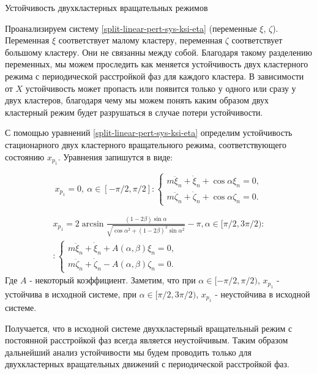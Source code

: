 \begin{chapter}{Устойчивость двухкластерных вращательных режимов}
	
	Проанализируем систему \ref{split-linear-pert-sys-ksi-eta} (переменные $\xi$, $\zeta$).
	Переменная $\xi$ соответствует малому кластеру, переменная $\zeta$ соответствует большому кластеру. 
	Они не связанны между собой.
	Благодаря такому разделению переменных, мы можем проследить как меняется устойчивость
	двух кластерного режима с периодической расстройкой фаз для каждого кластера. В зависимости от $X$ устойчивость
	может пропасть или появится только у одного или сразу у двух кластеров, благодаря чему мы можем
	понять каким образом двух кластерный режим будет разрушаться в случае потери устойчивости.

	С помощью уравнений \ref{split-linear-pert-sys-ksi-eta} определим устойчивость стационарного
	двух кластерного вращательного режима, соответствующего состоянию $x_{p_1}$.
	Уравнения запишутся в виде:

	\begin{equation}
		x_{p_1} = 0, \ \alpha \in [-\pi/ 2, \pi/2]: 
		\begin{cases}
			m\ddot{\xi}_n + \dot{\xi}_n + \cos{\alpha}\xi_n = 0, \\
			m\ddot{\zeta}_n + \dot{\zeta}_n + \cos{\alpha}\zeta_n = 0.
		\end{cases}
	\end{equation}

	\begin{equation}
		\begin{split}
			x_{p_1} = 2\arcsin{\frac{(1 - 2\beta) \sin{\alpha}}{\sqrt{\cos{\alpha}^2 + (1 - 2\beta)^2\sin{\alpha}^2}}} - \pi , \alpha \in [\pi/2, 3\pi/2): \\ 
			:\begin{cases}
				m\ddot{\xi}_n + \dot{\xi}_n + A(\alpha, \beta) \xi_n = 0, \\
				m\ddot{\zeta}_n + \dot{\zeta}_n -A(\alpha, \beta) \zeta_n = 0.
			\end{cases}
		\end{split}
	\end{equation}
	Где $A$ - некоторый коэффициент. Заметим, что при $\alpha \in [-\pi/ 2, \pi/2)$, $x_{p_1}$ - устойчива в исходной системе,
	при $\alpha \in [\pi/2, 3\pi/2)$, $x_{p_1}$ - неустойчива в исходной системе.

	Получается, что в исходной системе двухкластерный вращательный режим с постоянной расстройкой фаз всегда является неустойчивым.
	Таким образом дальнейший анализ устойчивости мы будем проводить только для двухкластерных вращательных движений с периодической
	расстройкой фаз.

\end{chapter}
